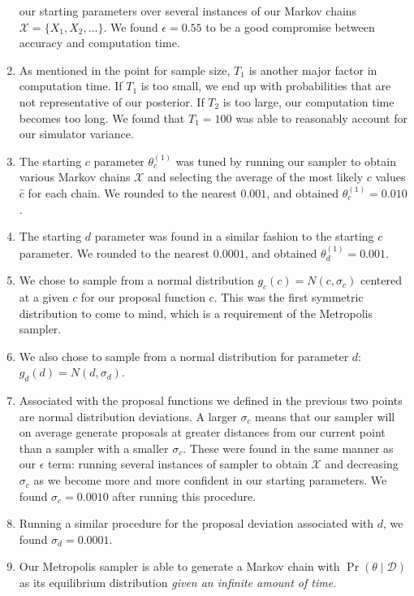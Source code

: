 \begin{enumerate}
        our starting parameters over several instances of our Markov chains $\mathcal{X} = \{ X_1, X_2, \ldots \}$.
        We found $\epsilon=0.55$ to be a good compromise between accuracy and computation time.
    \item As mentioned in the point for sample size, $T_1$ is another major factor in computation time.
        If $T_1$ is too small, we end up with probabilities that are not representative of our posterior.
        If $T_2$ is too large, our computation time becomes too long.
        We found that $T_1 = 100$ was able to reasonably account for our simulator variance.
    \item The starting $c$ parameter $\theta^{(1)}_c$ was tuned by running our sampler to obtain various Markov chains
        $\mathcal{X}$ and selecting the average of the most likely $c$ values $\hat{c}$ for each chain.
        We rounded to the nearest $0.001$, and obtained $\theta^{(1)}_c = 0.010$.
    \item The starting $d$ parameter was found in a similar fashion to the starting $c$ parameter.
        We rounded to the nearest $0.0001$, and obtained $\theta^{(1)}_d = 0.001$.
    \item We chose to sample from a normal distribution $g_c(c) = N(c, \sigma_c)$ centered at a given $c$ for our
        proposal function $c$.
        This was the first symmetric distribution to come to mind, which is a requirement of the Metropolis sampler.
    \item We also chose to sample from a normal distribution for parameter $d$: $g_d(d) = N(d, \sigma_d)$.
    \item Associated with the proposal functions we defined in the previous two points are normal distribution
        deviations.
        A larger $\sigma_c$ means that our sampler will on average generate proposals at greater distances from our
        current point than a sampler with a smaller $\sigma_c$.
        These were found in the same manner as our $\epsilon$ term: running several instances of sampler to obtain
        $\mathcal{X}$ and decreasing $\sigma_c$ as we become more and more confident in our starting parameters.
        We found $\sigma_c = 0.0010$ after running this procedure.
    \item Running a similar procedure for the proposal deviation associated with $d$, we found $\sigma_d = 0.0001$.
    \item Our Metropolis sampler is able to generate a Markov chain with $\Pr(\theta \mid \mathcal{D})$ as its
        equilibrium distribution \emph{given an infinite amount of time}.

\end{enumerate}
